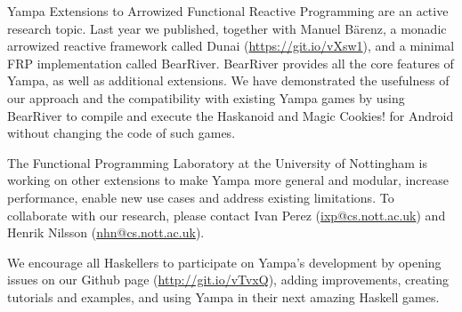\begin{hcarentry}[updated]{Yampa}
Extensions to Arrowized Functional Reactive Programming are an active research
topic. Last year we published, together with Manuel B\"arenz, a monadic
arrowized reactive framework called Dunai
(\href{https://git.io/vXsw1}{https://git.io/vXsw1}), and a minimal FRP
implementation called BearRiver. BearRiver provides all the core features of
Yampa, as well as additional extensions. We have demonstrated the usefulness of
our approach and the compatibility with existing Yampa games by using BearRiver
to compile and execute the Haskanoid and Magic Cookies! for Android without
changing the code of such games.

The Functional Programming Laboratory at the University of Nottingham is
working on other extensions to make Yampa more general and modular, increase
performance, enable new use cases and address existing limitations. To
collaborate with our research, please contact Ivan Perez
(\href{mailto:ixp@cs.nott.ac.uk}{ixp@cs.nott.ac.uk}) and Henrik Nilsson
(\href{mailto:nhn@cs.nott.ac.uk}{nhn@cs.nott.ac.uk}).

We encourage all Haskellers to participate on Yampa's development by opening
issues on our Github page (\href{http://git.io/vTvxQ}{http://git.io/vTvxQ}),
adding improvements, creating tutorials and examples, and using Yampa in their
next amazing Haskell games.

\end{hcarentry}
